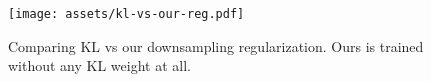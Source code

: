 \begin{figure}
\centering
\texttt{[image: assets/kl-vs-our-reg.pdf]}
\caption{Comparing KL vs our downsampling regularization. Ours is trained without any KL weight at all.}
\label{fig:kl-vs-downreg}
\end{figure}
